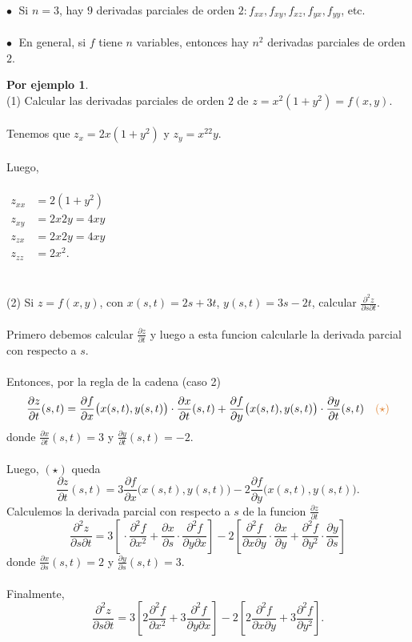 \documentclass{article}
\theoremstyle{definition}
\theoremstyle{definition}
\newtheorem*{ej}{Por ejemplo}
\theoremstyle{remark}
\newcommand\bl{$\bullet\;$}
\begin{document}
\textcolor{verdep2}{\bl} Si $n=3$, hay $9$ derivadas parciales de orden $2 : f_{xx},f_{xy},f_{xz},f_{yx},f_{yy}$, etc. \\\\
\textcolor{verdep2}{\bl} En general, si $f$ tiene $n$ variables, entonces hay $n^2$ derivadas parciales de orden $2$. \pagebreak
\begin{ej}
  \;\\ 
  \textcolor{verdep2}{(1)} Calcular las derivadas parciales de orden $2$ de $z = x^2 (1+y^2)=f(x,y)$.\\\\
  Tenemos que $z_x=2x(1+y^2)$ \; y \; $z_y=x^22y$.\\\\ Luego,\\\\ $\begin{aligned}
    z_{xx} & = 2(1+y^2) \\
    z_{xy} & = 2x2y=4xy \\
    z_{zx} & = 2x2y=4xy \\
    z_{zz} & = 2x^2.
  \end{aligned}$
  \\\\\\
  \textcolor{verdep2}{(2)} Si $z=f(x,y)$, con $x(s,t)=2s+3t$, $y(s,t)=3s-2t$, calcular $\frac{\partial^2 z}{\partial s \partial t}$.\\\\
  Primero debemos calcular $\frac{\partial z}{\partial t}$ y luego a esta funcion calcularle la derivada parcial con respecto a $s$. \\\\ Entonces, por la regla de la cadena (caso 2) \[
    \frac{\partial z}{\partial t}(s,t)=\frac{\partial f}{\partial x}\big(x(s,t),y(s,t)\big) \cdot \frac{\partial x}{\partial t}(s,t)+\frac{\partial f}{\partial y}\big(x(s,t),y(s,t)\big) \cdot \frac{\partial y}{\partial t}(s,t) \quad \textcolor{rojop2}{(\star)}
    \] donde $\frac{\partial x}{\partial t}(s,t)=3$ \; y \; $\frac{\partial y}{\partial t}(s,t)=-2.$ \\\\ Luego, \textcolor{rojop2}{$(\star)$} queda \[
    \frac{\partial z}{\partial t}(s,t)=3\frac{\partial f}{\partial x}\big(x(s,t),y(s,t)\big)-2\frac{\partial f}{\partial y}\big(x(s,t),y(s,t)\big).
    \]Calculemos la derivada parcial con respecto a $s$ de la funcion $\frac{\partial z}{\partial t}$ \[
    \frac{\partial^2z}{\partial s\partial t}=3\left[\frac{}{}\cdot \frac{\partial^2 f}{\partial x^2} + \frac{\partial x}{\partial s} \cdot \frac{\partial^2 f}{\partial y \partial x}\right]-2\left[\frac{\partial^2 f}{\partial x \partial y} \cdot \frac{\partial x}{\partial y} + \frac{\partial^2 f}{\partial y^2} \cdot \frac{\partial y}{\partial s}\right]
    \] donde $\frac{\partial x}{\partial s}(s,t)=2$ \; y \; $\frac{\partial y}{\partial s}(s,t)=3$.\\\\ Finalmente, \[
    \frac{\partial^2 z}{\partial s \partial t}=3\left[2 \frac{\partial^2 f}{\partial x^2}+3 \frac{\partial^2 f}{\partial y \partial x}\right]-2\left[2 \frac{\partial^2 f}{\partial x \partial y}+3\frac{\partial^2 f}{\partial y^2}\right].
  \]
\end{ej}
\end{document}
